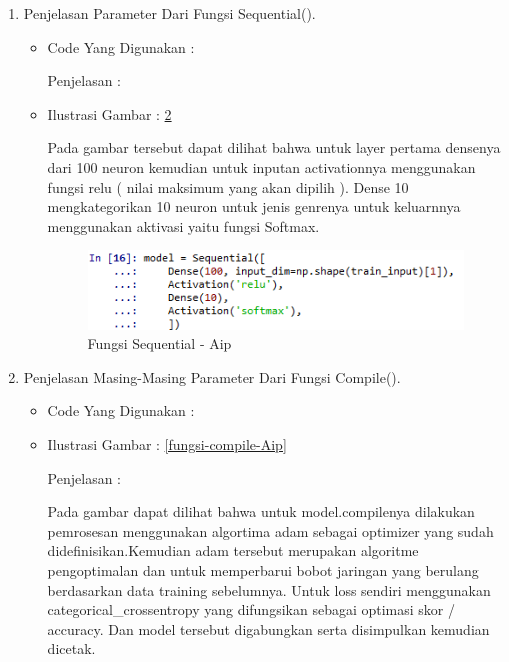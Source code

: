 \begin{enumerate}
\begin{itemize}
\begin{itemize}
\begin{figure}[ht]
\caption{Pemisahan Data Training Dan Dataset 2 - Aip}
\label{pemisahan-data-train-set-2-Aip}
\end{figure}
\par
\end{itemize}
\end{itemize}
\par
\par
\item Penjelasan Parameter Dari Fungsi Sequential().
\begin{itemize}
\item Code Yang Digunakan :
\par

\par Penjelasan :
\item Ilustrasi Gambar : \ref{fungsi-sequential-Aip}
\par Pada gambar tersebut dapat dilihat bahwa untuk layer pertama densenya dari 100 neuron kemudian untuk inputan activationnya menggunakan fungsi relu ( nilai maksimum yang akan dipilih ). Dense 10 mengkategorikan 10 neuron untuk jenis genrenya untuk keluarnnya menggunakan aktivasi yaitu fungsi Softmax.
\begin{figure}[ht]
\centering
\includegraphics[scale=0.2]{figures/AIP/sequential.PNG}
\caption{Fungsi Sequential - Aip}
\label{fungsi-sequential-Aip}
\end{figure}
\par
\end{itemize}
\par
\par
\item Penjelasan Masing-Masing Parameter Dari Fungsi Compile().
\begin{itemize}
\item Code Yang Digunakan :
\par

\par
\par
\item Ilustrasi Gambar : \ref{fungsi-compile-Aip}
\par
\par Penjelasan :
\par Pada gambar dapat dilihat bahwa untuk model.compilenya dilakukan pemrosesan menggunakan algortima adam sebagai optimizer yang sudah didefinisikan.Kemudian adam tersebut merupakan algoritme pengoptimalan dan untuk memperbarui bobot jaringan yang berulang berdasarkan data training sebelumnya. Untuk loss sendiri menggunakan categorical\_crossentropy yang difungsikan sebagai optimasi skor / accuracy. Dan model tersebut digabungkan serta disimpulkan kemudian dicetak.

\end{itemize}
\end{enumerate}
